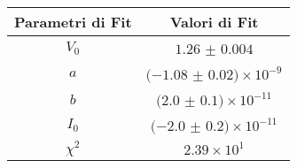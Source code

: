 \begin{tabular}{cc}
\hline
	Parametri di Fit & Valori di Fit\\ 
\hline
	$V_0$ & $1.26$ $\pm$ $0.004$ \\
	$a$ & $(-1.08$ $\pm$ $0.02)\times 10^{-9}$ \\
	$b$ & $(2.0$ $\pm$ $0.1)\times 10^{-11}$ \\
	$I_0$ & $(-2.0$ $\pm$ $0.2)\times 10^{-11}$ \\
	$\chi^2$ & $2.39\times 10^{1}$ \\
\hline
\end{tabular}
